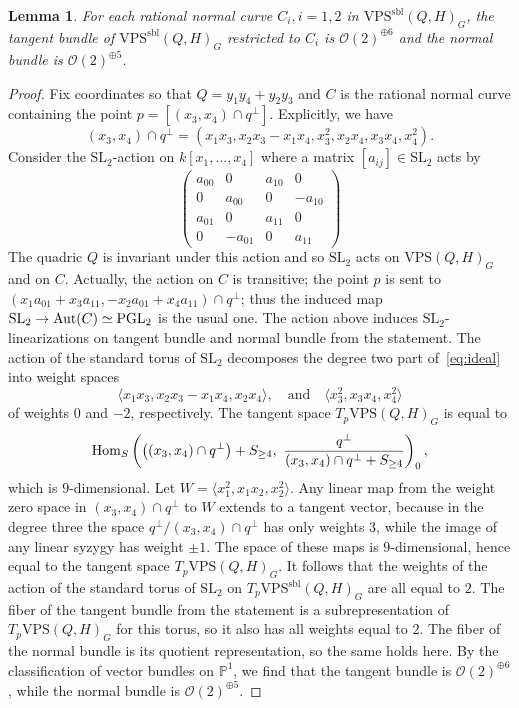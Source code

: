 \documentclass{amsart}
\newcommand{\Aut}{{\rm Aut}}
\newcommand{\Hom}{{\rm{Hom}}}
\newcommand{\OO}{{\mathcal{O}}}
\newcommand{\VPSsbl}{{\mathrm{VPS}}^{\mathrm{sbl}}(Q, H)}
\newcommand{\VPS}{\mathrm{VPS}(Q, H)}
\newcommand{\PGL}{\mathrm{PGL}}%
\newcommand{\SL}{\mathrm{SL}}%
\newtheorem{lemma}{\bf Lemma}[section]
\begin{document}
\begin{lemma}\label{ref:normalBundle:lem}
    For each rational normal curve $C_i, i=1,2$ in $\VPSsbl_G$, the
    tangent bundle
    of $\VPSsbl_G$ restricted to $C_i$ is $\OO(2)^{\oplus 6}$ and the normal bundle is $\OO(2)^{\oplus 5}$.
\end{lemma}
\begin{proof}
    Fix coordinates so that $Q = y_1y_4 + y_2y_3$ and $C$ is the rational
    normal curve containing the point $p = [(x_3, x_4)\cap q^\perp]$.
    Explicitly, we have
    \begin{equation}\label{eq:ideal}
        (x_3, x_4)\cap q^\perp = (x_1x_3, x_2x_3 - x_1x_4, x_3^2, x_2x_4, x_3x_4,
        x_4^2).
    \end{equation}
    Consider the $\SL_2$-action on $k[x_1, \ldots ,x_4]$ where a matrix
    $[a_{ij}]\in \SL_2$ acts by
    \[
        \begin{pmatrix}
            a_{00} & 0 & a_{10} & 0\\
            0 & a_{00} & 0 & -a_{10}\\
            a_{01} & 0 & a_{11} & 0\\
            0 & -a_{01} & 0 & a_{11}
        \end{pmatrix}
    \]
    The quadric $Q$ is invariant under this action and so $\SL_2$ acts on
    $\VPS_G$ and on $C$. Actually, the action on $C$ is transitive; the
    point $p$ is sent to $(x_1a_{01} + x_{3}a_{11}, -x_2a_{01}+x_4a_{11})\cap
    q^\perp$; thus the induced map $\SL_2\to \Aut(C)  \simeq \PGL_2$ is the
    usual one. The action above induces $\SL_2$-linearizations on tangent bundle and normal bundle from the statement.
    The action of the standard torus of $\SL_2$ decomposes the degree two part
    of~\eqref{eq:ideal} into weight spaces
    \[
        \langle x_1x_3, x_2x_3 - x_1x_4, x_2x_4 \rangle,\quad \mbox{and}\quad
        \langle x_3^2, x_3x_4, x_4^2\rangle
    \]
    of weights $0$ and $-2$, respectively.
    The tangent space $T_{p}\VPS_G$ is equal to
    \[
        \Hom_{S}\left( \left((x_3, x_4)\cap q^\perp\right) + S_{\geq 4},\ \frac{q^\perp}{(x_3,
            x_4)\cap q^\perp + S_{\geq 4}} \right)_0,
    \]
    which is $9$-dimensional. Let $W = \langle x_1^2, x_1x_2, x_2^2\rangle$.
    Any linear map from the weight zero space in $(x_3, x_4)\cap q^\perp$ to
    $W$ extends to a tangent vector, because in the degree three the space $q^\perp/(x_3, x_4)\cap
    q^\perp$ has only weights $3$, while the image of any linear syzygy
    has weight $\pm 1$. The space of these maps is
    $9$-dimensional, hence equal to the tangent space $T_{p}\VPS_G$. It
    follows that the weights of the action of the standard torus of $\SL_2$ on
    $T_{p}\VPSsbl_G$ are all equal to $2$.
    The fiber of the tangent bundle from the statement is a subrepresentation
    of $T_{p}\VPS_G$ for this torus, so it also has all weights equal to $2$.
    The fiber of the normal bundle is its quotient representation, so the same
    holds here. By the classification of vector bundles on $\mathbb{P}^1$, we
    find that the tangent bundle is $\OO(2)^{\oplus 6}$, while the normal
    bundle is $\OO(2)^{\oplus 5}$.
\end{proof}
\end{document}
